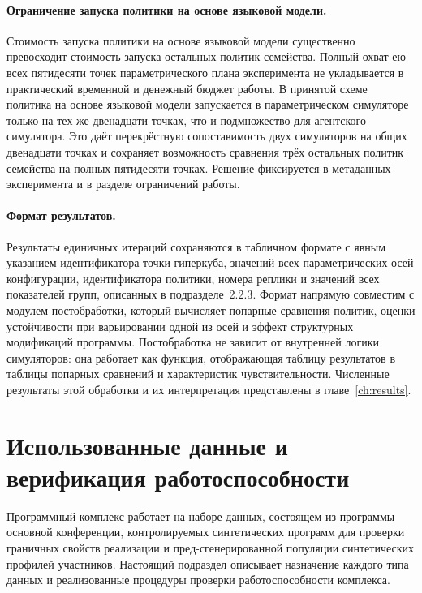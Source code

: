\paragraph{Ограничение запуска политики на основе языковой модели.}
Стоимость запуска политики на основе языковой модели существенно превосходит стоимость запуска остальных политик семейства. Полный охват ею всех пятидесяти точек параметрического плана эксперимента не укладывается в практический временной и денежный бюджет работы. В принятой схеме политика на основе языковой модели запускается в параметрическом симуляторе только на тех же двенадцати точках, что и подмножество для агентского симулятора. Это даёт перекрёстную сопоставимость двух симуляторов на общих двенадцати точках и сохраняет возможность сравнения трёх остальных политик семейства на полных пятидесяти точках. Решение фиксируется в метаданных эксперимента и в разделе ограничений работы.

\paragraph{Формат результатов.}
Результаты единичных итераций сохраняются в табличном формате с явным указанием идентификатора точки гиперкуба, значений всех параметрических осей конфигурации, идентификатора политики, номера реплики и значений всех показателей групп, описанных в подразделе~2.2.3. Формат напрямую совместим с модулем постобработки, который вычисляет попарные сравнения политик, оценки устойчивости при варьировании одной из осей и эффект структурных модификаций программы. Постобработка не зависит от внутренней логики симуляторов: она работает как функция, отображающая таблицу результатов в таблицы попарных сравнений и характеристик чувствительности. Численные результаты этой обработки и их интерпретация представлены в главе~\ref{ch:results}.


\section{Использованные данные и верификация работоспособности}
\label{sec:3-7}

Программный комплекс работает на наборе данных, состоящем из программы основной конференции, контролируемых синтетических программ для проверки граничных свойств реализации и пред-сгенерированной популяции синтетических профилей участников. Настоящий подраздел описывает назначение каждого типа данных и реализованные процедуры проверки работоспособности комплекса.

